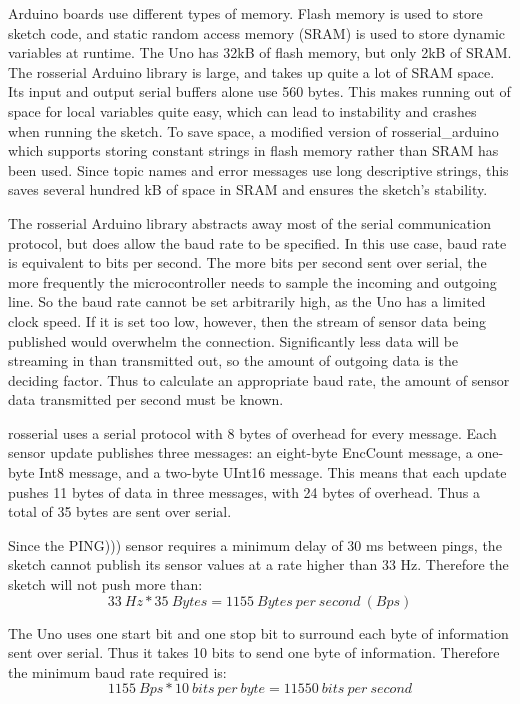 Arduino boards use different types of memory. Flash memory is used to store sketch code, and static random access memory (SRAM) is used to store dynamic variables at runtime. The Uno has 32kB of flash memory, but only 2kB of SRAM. The rosserial Arduino library is large, and takes up quite a lot of SRAM space. Its input and output serial buffers alone use 560 bytes. This makes running out of space for local variables quite easy, which can lead to instability and crashes when running the sketch. To save space, a modified version of rosserial\_arduino which supports storing constant strings in flash memory rather than SRAM has been used. Since topic names and error messages use long descriptive strings, this saves several hundred kB of space in SRAM and ensures the sketch's stability.

The rosserial Arduino library abstracts away most of the serial communication protocol, but does allow the baud rate to be specified. In this use case, baud rate is equivalent to bits per second. The more bits per second sent over serial, the more frequently the microcontroller needs to sample the incoming and outgoing line. So the baud rate cannot be set arbitrarily high, as the Uno has a limited clock speed. If it is set too low, however, then the stream of sensor data being published would overwhelm the connection. Significantly less data will be streaming in than transmitted out, so the amount of outgoing data is the deciding factor. Thus to calculate an appropriate baud rate, the amount of sensor data transmitted per second must be known.

rosserial uses a serial protocol with 8 bytes of overhead for every message. Each sensor update publishes three messages: an eight-byte EncCount message, a one-byte Int8 message, and a two-byte UInt16 message. This means that each update pushes 11 bytes of data in three messages, with 24 bytes of overhead. Thus a total of 35 bytes are sent over serial.

Since the PING))) sensor requires a minimum delay of 30 ms between pings, the sketch cannot publish its sensor values at a rate higher than 33 Hz. Therefore the sketch will not push more than:
\[33\ Hz * 35\ Bytes = 1155\ Bytes\ per\ second\ (Bps)\]

The Uno uses one start bit and one stop bit to surround each byte of information sent over serial. Thus it takes 10 bits to send one byte of information. Therefore the minimum baud rate required is:
\[1155\ Bps * 10\ bits\ per\ byte = 11550\ bits\ per\ second\]


